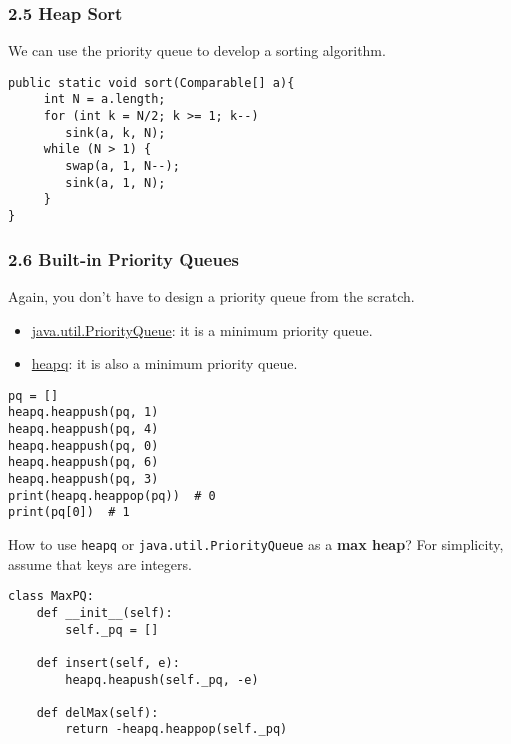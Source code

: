 \documentclass[aspectratio=169, 14pt]{beamer}
\begin{document}
\begin{frame}[fragile]
	\frametitle{2.5 Heap Sort}
	We can use the priority queue to develop a sorting algorithm.

	\begin{verbatim}
public static void sort(Comparable[] a){
     int N = a.length;
     for (int k = N/2; k >= 1; k--)
        sink(a, k, N);
     while (N > 1) {
        swap(a, 1, N--);
        sink(a, 1, N);
     }
}
\end{verbatim}
\end{frame}

\begin{frame}[fragile]
	\frametitle{2.6 Built-in Priority Queues}
	Again, you don't have to design a priority queue from the scratch.

	\begin{itemize}
		\item {} \href{https://docs.oracle.com/en/java/javase/11/docs/api/java.base/java/util/PriorityQueue.html}{java.util.PriorityQueue}: it is a minimum priority queue.
		\item {} \href{https://docs.python.org/3/library/heapq.html}{heapq}: it is also a minimum priority queue.
	\end{itemize}

	\begin{verbatim}
pq = []
heapq.heappush(pq, 1)
heapq.heappush(pq, 4)
heapq.heappush(pq, 0)
heapq.heappush(pq, 6)
heapq.heappush(pq, 3)
print(heapq.heappop(pq))  # 0
print(pq[0])  # 1
\end{verbatim}

\end{frame}

\begin{frame}[fragile]
	 How to use \texttt{heapq} or \texttt{java.util.PriorityQueue} as a \textbf{max heap}? For simplicity, assume that keys are integers.

	\pause

	\begin{verbatim}
class MaxPQ:
    def __init__(self):
        self._pq = []
    
    def insert(self, e):
        heapq.heapush(self._pq, -e)
    
    def delMax(self):
        return -heapq.heappop(self._pq)
\end{verbatim}

\end{frame}
\end{document}
